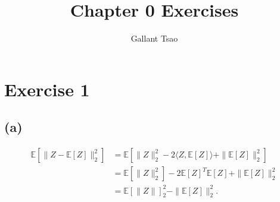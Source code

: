 \documentclass{article}
\title{Chapter 0 Exercises}
\author{Gallant Tsao}
\date{}
\begin{document}
\maketitle


\section*{Exercise 1}
\subsection*{(a)}
\begin{align*}
	\mathbb{E}[\|Z - \mathbb{E}[Z]\|_2^2] 
	&= \mathbb{E}[\|Z\|_2^2 - 2 \langle Z, \mathbb{E}[Z] \rangle + \|\mathbb{E}[Z]\|_2^2] \\
	&= \mathbb{E}[\|Z\|_2^2] - 2 \mathbb{E}[Z]^T \mathbb{E}[Z] + \|\mathbb{E}[Z]\|_2^2 \\
	&= \mathbb{E}[\|Z\|]_2^2 - \|\mathbb{E}[Z]\|_2^2.
\end{align*}
\end{document}
